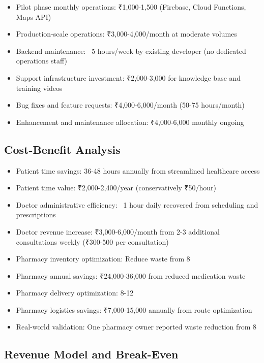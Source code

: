 \documentclass[12pt,a4paper]{report}
\begin{document}
\begin{itemize}
  \item Pilot phase monthly operations: ₹1,000-1,500 (Firebase, Cloud Functions, Maps API)
  \item Production-scale operations: ₹3,000-4,000/month at moderate volumes
  \item Backend maintenance: ~5 hours/week by existing developer (no dedicated operations staff)
  \item Support infrastructure investment: ₹2,000-3,000 for knowledge base and training videos
  \item Bug fixes and feature requests: ₹4,000-6,000/month (50-75 hours/month)
  \item Enhancement and maintenance allocation: ₹4,000-6,000 monthly ongoing
\end{itemize}

\subsection{Cost-Benefit Analysis}

\begin{itemize}
  \item Patient time savings: 36-48 hours annually from streamlined healthcare access
  \item Patient time value: ₹2,000-2,400/year (conservatively ₹50/hour)
  \item Doctor administrative efficiency: ~1 hour daily recovered from scheduling and prescriptions
  \item Doctor revenue increase: ₹3,000-6,000/month from 2-3 additional consultations weekly (₹300-500 per consultation)
  \item Pharmacy inventory optimization: Reduce waste from 8%
  \item Pharmacy annual savings: ₹24,000-36,000 from reduced medication waste
  \item Pharmacy delivery optimization: 8-12%
  \item Pharmacy logistics savings: ₹7,000-15,000 annually from route optimization
  \item Real-world validation: One pharmacy owner reported waste reduction from 8%
\end{itemize}

\subsection{Revenue Model and Break-Even}
\end{document}
